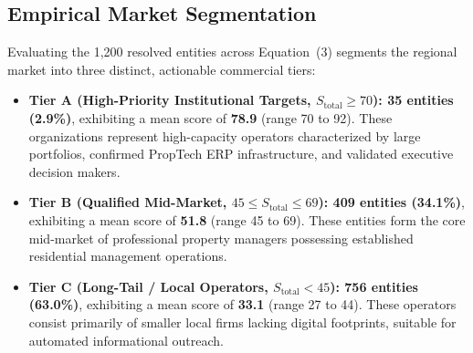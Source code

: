 \documentclass[11pt,a4paper]{article}
\begin{document}
\subsection{Empirical Market Segmentation}
Evaluating the 1,200 resolved entities across Equation~(3) segments the regional market into three distinct, actionable commercial tiers:
\begin{itemize}
    \item \textbf{Tier A (High-Priority Institutional Targets, $S_{\text{total}} \ge 70$): 35 entities (2.9\%)}, exhibiting a mean score of \textbf{78.9} (range 70 to 92). These organizations represent high-capacity operators characterized by large portfolios, confirmed PropTech ERP infrastructure, and validated executive decision makers.
    \item \textbf{Tier B (Qualified Mid-Market, $45 \le S_{\text{total}} \le 69$): 409 entities (34.1\%)}, exhibiting a mean score of \textbf{51.8} (range 45 to 69). These entities form the core mid-market of professional property managers possessing established residential management operations.
    \item \textbf{Tier C (Long-Tail / Local Operators, $S_{\text{total}} < 45$): 756 entities (63.0\%)}, exhibiting a mean score of \textbf{33.1} (range 27 to 44). These operators consist primarily of smaller local firms lacking digital footprints, suitable for automated informational outreach.
\end{itemize}
\end{document}
